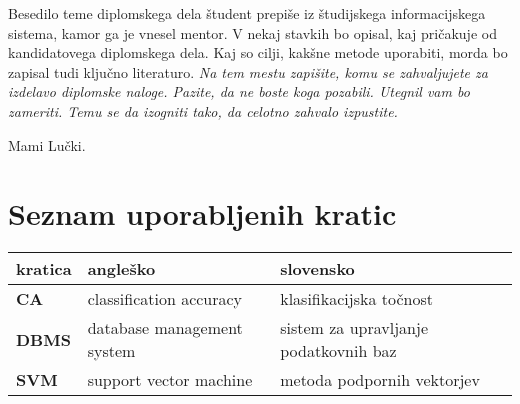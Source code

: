 \documentclass[a4paper, 12pt]{book}
\newcommand{\clearemptydoublepage}{\newpage{\pagestyle{empty}\cleardoublepage}}
\begin{document}
Besedilo teme diplomskega dela študent prepiše iz študijskega informacijskega sistema, kamor ga je vnesel mentor. V nekaj stavkih bo opisal, kaj pričakuje od kandidatovega diplomskega dela. Kaj so cilji, kakšne metode uporabiti, morda bo zapisal tudi ključno literaturo.
\vspace{15mm}
\vspace{2cm}
\clearemptydoublepage
\thispagestyle{empty}\mbox{}\vfill\null\it%
\noindent
Na tem mestu zapišite, komu se zahvaljujete za izdelavo diplomske naloge. Pazite, da ne boste koga pozabili. Utegnil vam bo zameriti. Temu se da izogniti tako, da celotno zahvalo izpustite.
\rm\normalfont
\clearemptydoublepage
\thispagestyle{empty}\mbox{}{\textheight}\mbox{}\hfill\begin{minipage}{0.55\textwidth}%
Mami Lučki.
\normalfont\end{minipage}
\clearemptydoublepage
\pagestyle{empty}
\def\thepage{}%
\tableofcontents{}
\clearemptydoublepage
\chapter*{Seznam uporabljenih kratic}  %
\begin{comment}
\begin{tabular}{l|l|l}
  {\bf kratica} & {\bf angleško} & {\bf slovensko} \\ \hline
  {\bf CA} & classification accuracy & klasifikacijska točnost \\
  {\bf DBMS} & database management system & sistem za upravljanje podatkovnih baz \\
  {\bf SVM} & support vector machine & metoda podpornih vektorjev \\
  \dots & \dots & \dots \\
\end{tabular}
\end{comment}
\noindent\begin{tabular}{p{}|p{}|p{}}    %
  {\bf kratica} & {\bf angleško}                             & {\bf slovensko} \\ \hline
  {\bf CA}      & classification accuracy               & klasifikacijska točnost \\
  {\bf DBMS} & database management system & sistem za upravljanje podatkovnih baz \\
  {\bf SVM}   & support vector machine              & metoda podpornih vektorjev \\
\end{tabular}
\clearemptydoublepage
\end{document}
